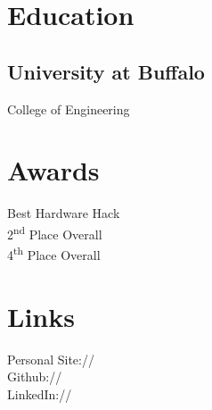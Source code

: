 \documentclass[]{deedy-resume-openfont}
\begin{document}
%
%
\lastupdated

%
%



%
%

\begin{minipage}[t]{0.33\textwidth}


\section{Education}

\subsection{University at Buffalo}

College of Engineering \\
\sectionsep


\section{Awards}
Best Hardware Hack\\
2\textsuperscript{nd} Place Overall\\
4\textsuperscript{th} Place Overall\\
\sectionsep


\section{Links}
Personal Site:// \href{https://alexander.directory}{} \\
Github:// \href{https://github.com/xanderrman}{} \\
LinkedIn://  \href{https://www.linkedin.com/in/alex-anelli}{} \\
\sectionsep


\end{minipage}
\end{document}
